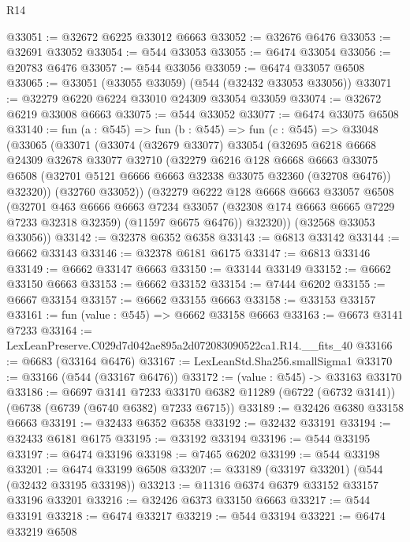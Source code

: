 \begin{lexlean}{R14}
\begin{coremodule}
@33051 := @32672 @6225 @33012 @6663
@33052 := @32676 @6476
@33053 := @32691 @33052
@33054 := @544 @33053
@33055 := @6474 @33054
@33056 := @20783 @6476
@33057 := @544 @33056
@33059 := @6474 @33057 @6508
@33065 := @33051 (@33055 @33059) (@544 (@32432 @33053 @33056))
@33071 := @32279 @6220 @6224 @33010 @24309 @33054 @33059
@33074 := @32672 @6219 @33008 @6663
@33075 := @544 @33052
@33077 := @6474 @33075 @6508
@33140 := fun (a : @545) =>
  fun (b : @545) =>
  fun (c : @545) =>
  @33048
    (@33065
      (@33071
        (@33074
          (@32679 @33077)
          @33054
          (@32695
            @6218
            @6668
            @24309
            @32678
            @33077
            @32710
            (@32279
              @6216
              @128
              @6668
              @6663
              @33075
              @6508
              (@32701 @5121 @6666 @6663 @32338 @33075 @32360 (@32708 @6476))
              @32320))
          (@32760 @33052))
        (@32279
          @6222
          @128
          @6668
          @6663
          @33057
          @6508
          (@32701
            @463
            @6666
            @6663
            @7234
            @33057
            (@32308 @174 @6663 @6665 @7229 @7233 @32318 @32359)
            (@11597 @6675 @6476))
          @32320))
      (@32568 @33053 @33056))
@33142 := @32378 @6352 @6358
@33143 := @6813 @33142
@33144 := @6662 @33143
@33146 := @32378 @6181 @6175
@33147 := @6813 @33146
@33149 := @6662 @33147 @6663
@33150 := @33144 @33149
@33152 := @6662 @33150 @6663
@33153 := @6662 @33152
@33154 := @7444 @6202
@33155 := @6667 @33154
@33157 := @6662 @33155 @6663
@33158 := @33153 @33157
@33161 := fun (value : @545) => @6662 @33158 @6663
@33163 := @6673 @3141 @7233
@33164 := LexLeanPreserve.C029d7d042ae895a2d072083090522ca1.R14.__fits_40
@33166 := @6683 (@33164 @6476)
@33167 := LexLeanStd.Sha256.smallSigma1
@33170 := @33166 (@544 (@33167 @6476))
@33172 := (value : @545) -> @33163 @33170
@33186 := @6697
    @3141
    @7233
    @33170
    @6382
    @11289
    (@6722 (@6732 @3141))
    (@6738 (@6739 (@6740 @6382) @7233 @6715))
@33189 := @32426 @6380 @33158 @6663
@33191 := @32433 @6352 @6358
@33192 := @32432 @33191
@33194 := @32433 @6181 @6175
@33195 := @33192 @33194
@33196 := @544 @33195
@33197 := @6474 @33196
@33198 := @7465 @6202
@33199 := @544 @33198
@33201 := @6474 @33199 @6508
@33207 := @33189 (@33197 @33201) (@544 (@32432 @33195 @33198))
@33213 := @11316 @6374 @6379 @33152 @33157 @33196 @33201
@33216 := @32426 @6373 @33150 @6663
@33217 := @544 @33191
@33218 := @6474 @33217
@33219 := @544 @33194
@33221 := @6474 @33219 @6508

\end{coremodule}
\end{lexlean}
